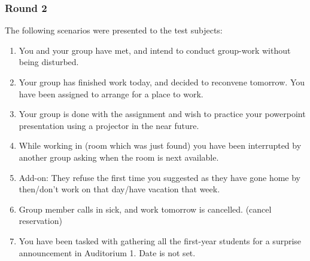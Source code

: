 \subsubsection{Round 2}
The following scenarios were presented to the test subjects:
\begin{enumerate}
\item You and your group have met, and intend to conduct group-work without being disturbed.
\item Your group has finished work today, and decided to reconvene tomorrow. You have been assigned to arrange for a place to work.
\item Your group is done with the assignment and wish to practice your powerpoint presentation using a projector in the near future.
\item While working in (room which was just found) you have been interrupted by another group asking when the room is next available.
\item Add-on: They refuse the first time you suggested as they have gone home by then/don't work on that day/have vacation that week.
\item Group member calls in sick, and work tomorrow is cancelled. (cancel reservation)
\item You have been tasked with gathering all the first-year students for a surprise announcement in Auditorium 1. Date is not set.
\end{enumerate}

